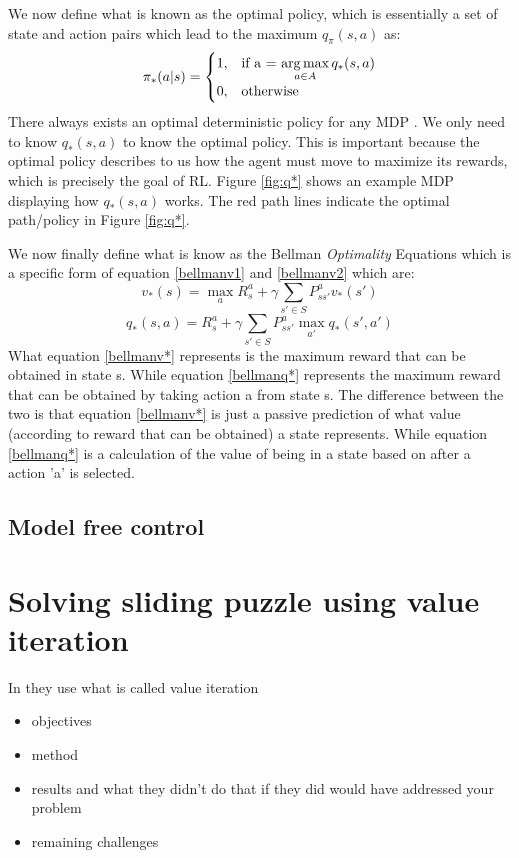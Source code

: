We now define what is known as the optimal policy, which is essentially a set of state and action pairs which lead to the maximum $q_\pi(s,a)$ as:
\begin{align}
	\pi_{*}(a|s)=\begin{cases}
		1, & \text{if a = $\operatorname*{arg\,max}\limits_{a \in A}q_* (s,a)$}\\
		0, & \text{otherwise}
	\end{cases}
\end{align}
There always exists an optimal deterministic policy for any MDP \cite{sutton_barto}. We only need to know $q_* (s,a)$ to know the optimal policy. This is important because the optimal policy describes to us how the agent must move to maximize its rewards, which is precisely the goal of RL. Figure \ref{fig:q*} shows an example MDP displaying how $q_* (s,a)$ works. The red path lines indicate the optimal path/policy in Figure \ref{fig:q*}.

We now finally define what is know as the Bellman \textit{Optimality} Equations which is a specific form of equation \ref{bellmanv1} and \ref{bellmanv2} which are:
\begin{equation}
	v_*(s) = \max\limits_{a}R^{a}_s+\gamma\sum_{s'\in S}P^{a}_{ss'}v_*(s')
	\label{bellmanv*}
\end{equation}
\begin{equation}
	q_*(s,a) = R^{a}_s +\gamma \sum_{s'\in S}P^{a}_{ss'}\max\limits_{a'}q_*(s',a')
	\label{bellmanq*}
\end{equation}
What equation \ref{bellmanv*} represents is the maximum reward that can be obtained in state s. While equation \ref{bellmanq*} represents the maximum reward that can be obtained by taking action a from state s. The difference between the two is that equation \ref{bellmanv*} is just a passive prediction of what value (according to reward that can be obtained) a state represents. While equation \ref{bellmanq*} is a calculation of the value of being in a state based on after a action 'a' is selected.

\subsection{Model free control}

\section{Solving sliding puzzle using value iteration}
In \cite{15-puzzle_value_iteration} they use what is called value iteration
\begin{itemize}
	\item objectives
	\item method
	\item results and what they didn't do that if they did would have addressed your problem
	\item remaining challenges
	
\end{itemize}


